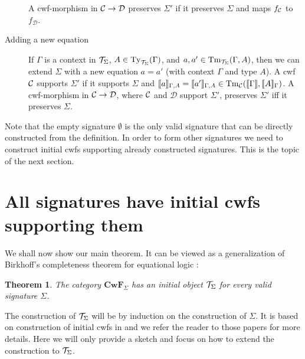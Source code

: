 \documentclass{lmcs}
\newtheorem{theorem}{Theorem}
\def\D{\mathcal{D}}
\def\Cwf{\mathbf{CwF}}
\begin{document}
\begin{definition}
\begin{description}
A cwf-morphism in $\C \to \D$ preserves $\Sigma'$ if it preserves $\Sigma$ and maps $f_{\mathcal C}$ to $f_\D$.
\item[Adding a new equation] 
If $\Gamma$ is a context in ${\mathcal T}_\Sigma$, $A \in \mathrm{Ty}_{{\mathcal T}_\Sigma}(\Gamma)$, and $a, a' \in \mathrm{Tm}_{{\mathcal T}_\Sigma}(\Gamma,A)$, then we can extend $\Sigma$ with a new equation $a = a'$ (with context $\Gamma$ and type $A$). A cwf ${\mathcal C}$ supports $\Sigma'$ if it supports $\Sigma$ and $\llbracket a \rrbracket_{\Gamma,A}= \llbracket a' \rrbracket_{\Gamma,A} \in \mathrm{Tm}_{\mathcal C}(\llbracket \Gamma \rrbracket,\llbracket A \rrbracket_\Gamma)$. A cwf-morphism in $\C \to \D$, where ${\mathcal C}$ and $\D$ support $\Sigma'$, preserves $\Sigma'$ iff it preserves $\Sigma$.
\end{description}
\end{definition}

Note that the empty signature $\emptyset$ is the only valid signature that can be directly constructed from the definition. In order to form other signatures we need to construct initial cwfs supporting already constructed signatures. This is the topic of the next section.

\section{All signatures have initial cwfs supporting them}

We shall now show our main theorem. It can be viewed as a generalization of Birkhoff's completeness theorem for equational logic \cite{birkhoff}:
\begin{theorem}
The category $\Cwf_\Sigma$ has an initial object ${\mathcal T}_\Sigma$ for every valid signature $\Sigma$.
\end{theorem}

The construction of ${\mathcal T}_\Sigma$ will be by induction on the construction of $\Sigma$. It is based on construction of initial cwfs in \cite{castellan:tlca2015,castellan:lmcs} and we refer the reader to those papers for more details. Here we will only provide a sketch and focus on how to extend the construction to ${\mathcal T}_\Sigma$.
\end{document}
